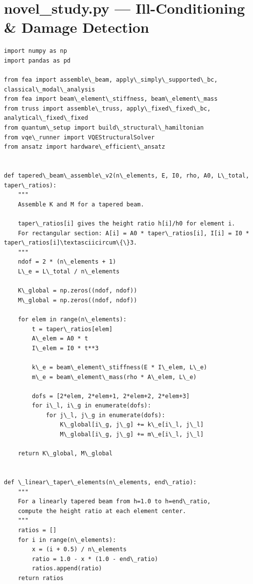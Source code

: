 \documentclass[12pt, a4paper]{article}
\begin{document}
\section{novel_study.py --- Ill-Conditioning & Damage Detection}
\begin{lstlisting}[style=codestyle, caption={{novel_study.py --- Ill-Conditioning & Damage Detection}}]
import numpy as np
import pandas as pd

from fea import assemble\_beam, apply\_simply\_supported\_bc, classical\_modal\_analysis
from fea import beam\_element\_stiffness, beam\_element\_mass
from truss import assemble\_truss, apply\_fixed\_fixed\_bc, analytical\_fixed\_fixed
from quantum\_setup import build\_structural\_hamiltonian
from vqe\_runner import VQEStructuralSolver
from ansatz import hardware\_efficient\_ansatz


def tapered\_beam\_assemble\_v2(n\_elements, E, I0, rho, A0, L\_total, taper\_ratios):
    """
    Assemble K and M for a tapered beam.

    taper\_ratios[i] gives the height ratio h[i]/h0 for element i.
    For rectangular section: A[i] = A0 * taper\_ratios[i], I[i] = I0 * taper\_ratios[i]\textasciicircum\{\}3.
    """
    ndof = 2 * (n\_elements + 1)
    L\_e = L\_total / n\_elements

    K\_global = np.zeros((ndof, ndof))
    M\_global = np.zeros((ndof, ndof))

    for elem in range(n\_elements):
        t = taper\_ratios[elem]
        A\_elem = A0 * t
        I\_elem = I0 * t**3

        k\_e = beam\_element\_stiffness(E * I\_elem, L\_e)
        m\_e = beam\_element\_mass(rho * A\_elem, L\_e)

        dofs = [2*elem, 2*elem+1, 2*elem+2, 2*elem+3]
        for i\_l, i\_g in enumerate(dofs):
            for j\_l, j\_g in enumerate(dofs):
                K\_global[i\_g, j\_g] += k\_e[i\_l, j\_l]
                M\_global[i\_g, j\_g] += m\_e[i\_l, j\_l]

    return K\_global, M\_global


def \_linear\_taper\_elements(n\_elements, end\_ratio):
    """
    For a linearly tapered beam from h=1.0 to h=end\_ratio,
    compute the height ratio at each element center.
    """
    ratios = []
    for i in range(n\_elements):
        x = (i + 0.5) / n\_elements
        ratio = 1.0 - x * (1.0 - end\_ratio)
        ratios.append(ratio)
    return ratios



\end{lstlisting}
\end{document}
